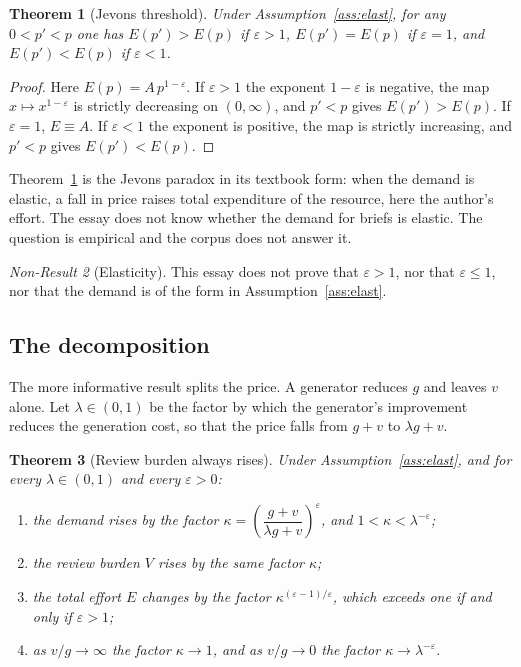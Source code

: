 \documentclass[11pt]{article}
\theoremstyle{plain}
\newtheorem{theorem}{Theorem}[section]
\theoremstyle{definition}
\theoremstyle{remark}
\newtheorem{nonresult}[theorem]{Non-Result}
\begin{document}
\begin{theorem}[Jevons threshold]\label{thm:jevons}
Under Assumption~\ref{ass:elast}, for any $0<p'<p$ one has $E(p')>E(p)$ if $\varepsilon>1$, $E(p')=E(p)$ if $\varepsilon=1$, and $E(p')<E(p)$ if $\varepsilon<1$.
\end{theorem}

\begin{proof}
Here $E(p)=A\,p^{1-\varepsilon}$. If $\varepsilon>1$ the exponent $1-\varepsilon$ is negative, the map $x\mapsto x^{1-\varepsilon}$ is strictly decreasing on $(0,\infty)$, and $p'<p$ gives $E(p')>E(p)$. If $\varepsilon=1$, $E\equiv A$. If $\varepsilon<1$ the exponent is positive, the map is strictly increasing, and $p'<p$ gives $E(p')<E(p)$. \qedhere
\end{proof}

Theorem~\ref{thm:jevons} is the Jevons paradox in its textbook form: when the demand is elastic, a fall in price raises total expenditure of the resource, here the author's effort. The essay does not know whether the demand for briefs is elastic. The question is empirical and the corpus does not answer it.

\begin{nonresult}[Elasticity]\label{nr:elast}
This essay does not prove that $\varepsilon>1$, nor that $\varepsilon\le1$, nor that the demand is of the form in Assumption~\ref{ass:elast}.
\end{nonresult}

\subsection{The decomposition}

The more informative result splits the price. A generator reduces $g$ and leaves $v$ alone. Let $\lambda\in(0,1)$ be the factor by which the generator's improvement reduces the generation cost, so that the price falls from $g+v$ to $\lambda g+v$.

\begin{theorem}[Review burden always rises]\label{thm:review}
Under Assumption~\ref{ass:elast}, and for every $\lambda\in(0,1)$ and every $\varepsilon>0$:
\begin{enumerate}
\item[(i)] the demand rises by the factor $\kappa=\left(\dfrac{g+v}{\lambda g+v}\right)^{\varepsilon}$, and $1<\kappa<\lambda^{-\varepsilon}$;
\item[(ii)] the review burden $V$ rises by the same factor $\kappa$;
\item[(iii)] the total effort $E$ changes by the factor $\kappa^{(\varepsilon-1)/\varepsilon}$, which exceeds one if and only if $\varepsilon>1$;
\item[(iv)] as $v/g\to\infty$ the factor $\kappa\to1$, and as $v/g\to0$ the factor $\kappa\to\lambda^{-\varepsilon}$.
\end{enumerate}
\end{theorem}
\end{document}
